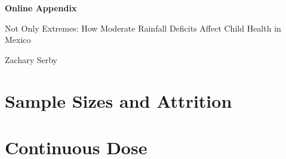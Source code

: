 \begin{center}
{\LARGE\bfseries Online Appendix\par}
\vspace{0.15in}
{\large Not Only Extremes: How Moderate Rainfall Deficits Affect Child Health in Mexico\par}
\vspace{0.1in}
{\large Zachary Serby\par}
\end{center}
\vspace{0.2in}
\renewcommand{\contentsname}{Table of Contents for Online Appendix}
\setcounter{tocdepth}{1}
\tableofcontents
\clearpage
\setcounter{table}{0}
\setcounter{figure}{0}
\renewcommand{\thetable}{OA\arabic{table}}
\renewcommand{\thefigure}{OA\arabic{figure}}
\renewcommand{\thesection}{\Alph{section}}

\section{Sample Sizes and Attrition}



\clearpage
\section{Continuous Dose}




